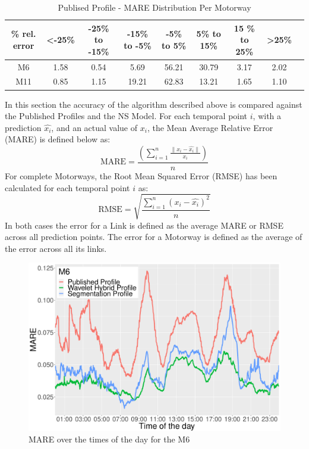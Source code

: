 \documentclass[letterpaper, 10 pt, conference]{ieeeconf}  %
\begin{document}
\begin{table}[bp]
	\caption{Publised Profile - MARE Distribution Per Motorway}
	\centering
	\begin{center}
		\begin{tabular}{|C|C|C|C|C|C|C|C|C|}
			\hline
			\textbf{\% rel. error}&{\textless -25\%}&{-25\%\textbf{ to }-15\%}&{-15\%\textbf{ to }-5\%}&{-5\%\textbf{ to }5\%}&{5\%\textbf{ to }15\%}&{15 \%\textbf{ to }25\%}&{\textgreater 25\%}\\
			\hline
			M6& 1.58& 0.54& 5.69& 56.21& 30.79& 3.17& 2.02\\
			\hline
			M11& 0.85& 1.15& 19.21& 62.83& 13.21& 1.65& 1.10\\
			\hline
		\end{tabular}
		\label{mapeglobal}
	\end{center}
\end{table}
In this section the accuracy of the algorithm described above is compared against the Published Profiles and the NS Model. 
For each temporal point $i$, with a prediction $\hat{x_i}$, and an actual value of $x_i$, the Mean Average Relative Error (MARE) is defined below as:
\begin{equation}
\textrm{MARE} =\frac{ \left( \sum_{i=1}^{n} \frac{\|x_i - \hat{x_i}\|}{x_i}\right)}{n}
\end{equation}
For complete Motorways, the Root Mean Squared Error (RMSE) has been calculated for each temporal point $i$ as:
\begin{equation}
\textrm{RMSE} = \sqrt{\frac{\sum_{i=1}^{n} (x_i - \hat{x_i})^2}{n}}
\end{equation}
In both cases the error for a Link is defined as the average MARE or RMSE across all prediction points.
The error for a Motorway is defined as the average of the error across all its links.
\begin{figure}[htbp]
	\centerline{\includegraphics[width=\linewidth]{./images/M6_daytime_8_12.pdf}}
	\caption{MARE over the times of the day for the M6}
	\label{fig:m6dt}
\end{figure}
\end{document}
